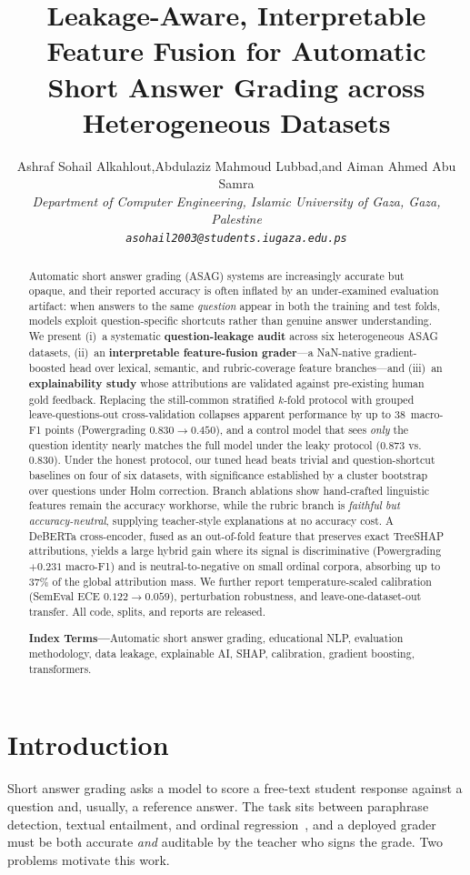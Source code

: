 \documentclass[10pt,twocolumn]{article}
\title{\vspace{-1.5em}\bfseries\large Leakage-Aware, Interpretable Feature Fusion
for Automatic Short Answer Grading across Heterogeneous Datasets}
\author{%
\normalsize Ashraf Sohail Alkahlout,\quad Abdulaziz Mahmoud Lubbad,\quad and Aiman Ahmed Abu Samra\\[2pt]
\small\itshape Department of Computer Engineering, Islamic University of Gaza, Gaza, Palestine\\[1pt]
\small\texttt{asohail2003@students.iugaza.edu.ps}}
\date{}
\begin{document}
\maketitle
\begin{abstract}
\noindent\small
Automatic short answer grading (ASAG) systems are increasingly accurate but
opaque, and their reported accuracy is often inflated by an under-examined
evaluation artifact: when answers to the same \emph{question} appear in both the
training and test folds, models exploit question-specific shortcuts rather than
genuine answer understanding. We present (i)~a systematic \textbf{question-leakage
audit} across six heterogeneous ASAG datasets, (ii)~an \textbf{interpretable
feature-fusion grader}---a NaN-native gradient-boosted head over lexical,
semantic, and rubric-coverage feature branches---and (iii)~an \textbf{explainability
study} whose attributions are validated against pre-existing human gold feedback.
Replacing the still-common stratified $k$-fold protocol with grouped
leave-questions-out cross-validation collapses apparent performance by up to
$38$~macro-F1 points (Powergrading $0.830\!\rightarrow\!0.450$), and a control
model that sees \emph{only} the question identity nearly matches the full model
under the leaky protocol ($0.873$ vs.\ $0.830$). Under the honest protocol, our
tuned head beats trivial and question-shortcut baselines on four of six datasets,
with significance established by a cluster bootstrap over questions under Holm
correction. Branch ablations show hand-crafted linguistic features remain the
accuracy workhorse, while the rubric branch is \emph{faithful but accuracy-neutral},
supplying teacher-style explanations at no accuracy cost. A DeBERTa cross-encoder,
fused as an out-of-fold feature that preserves exact TreeSHAP attributions,
yields a large hybrid gain where its signal is discriminative (Powergrading
$+0.231$ macro-F1) and is neutral-to-negative on small ordinal corpora, absorbing
up to $37\%$ of the global attribution mass. We further report temperature-scaled
calibration (SemEval ECE $0.122\!\rightarrow\!0.059$), perturbation robustness,
and leave-one-dataset-out transfer. All code, splits, and reports are released.

\medskip
\noindent\textbf{Index Terms---}Automatic short answer grading, educational NLP,
evaluation methodology, data leakage, explainable AI, SHAP, calibration, gradient
boosting, transformers.
\end{abstract}

\section{Introduction}
\label{sec:intro}
Short answer grading asks a model to score a free-text student response against a
question and, usually, a reference answer. The task sits between paraphrase
detection, textual entailment, and ordinal regression~\cite{burrows2015eras,
dzikovska2013semeval}, and a deployed grader must be both accurate \emph{and}
auditable by the teacher who signs the grade. Two problems motivate this work.
\end{document}
